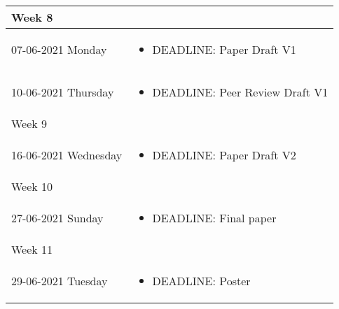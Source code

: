 \documentclass[english]{article}
\begin{document}
\begin{center}
\begin{tabular}{| p{} | p{} | }
\multicolumn{2}{l}{Week 8} \\
\hline

07-06-2021 Monday    & 
\begin{minipage}[t]{0.65\textwidth} \begin{itemize}
    \item DEADLINE: Paper Draft V1
\end{itemize} \end{minipage} \\   
\hline

10-06-2021 Thursday    & 
\begin{minipage}[t]{0.65\textwidth} \begin{itemize}
    \item DEADLINE: Peer Review Draft V1
\end{itemize} \end{minipage} \\   
\hline

\multicolumn{2}{l}{Week 9} \\
\hline

16-06-2021 Wednesday    & 
\begin{minipage}[t]{0.65\textwidth} \begin{itemize}
    \item DEADLINE: Paper Draft V2
\end{itemize} \end{minipage} \\   
\hline

\multicolumn{2}{l}{Week 10} \\
\hline

27-06-2021 Sunday    & 
\begin{minipage}[t]{0.65\textwidth} \begin{itemize}
    \item DEADLINE: Final paper
\end{itemize} \end{minipage} \\   
\hline

\multicolumn{2}{l}{Week 11} \\
\hline

29-06-2021 Tuesday    & 
\begin{minipage}[t]{0.65\textwidth} \begin{itemize}
    \item DEADLINE: Poster
\end{itemize} \end{minipage} \\   
\hline


\end{tabular}
\end{center}
\end{document}
